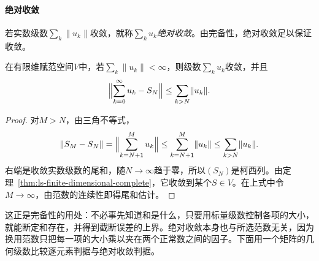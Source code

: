 \paragraph{绝对收敛}
若实数级数$\sum_k\lVert u_k\rVert$收敛，就称$\sum_ku_k$\emph{绝对收敛}。由完备性，绝对收敛足以保证收敛。
\begin{theorem}[绝对收敛的级数收敛]
\label{thm:ls-absolute-series-convergence}
在有限维赋范空间$V$中，若$\sum_k\lVert u_k\rVert<\infty$，则级数$\sum_ku_k$收敛，并且
\begin{equation}
 \Bigl\lVert\sum_{k=0}^\infty u_k-S_N\Bigr\rVert\leq\sum_{k>N}\lVert u_k\rVert .
 \label{eq:ls-absolute-series-tail}
\end{equation}
\end{theorem}
\begin{proof}
对$M>N$，由三角不等式，
\[
 \lVert S_M-S_N\rVert=\Bigl\lVert\sum_{k=N+1}^Mu_k\Bigr\rVert\leq\sum_{k=N+1}^M\lVert u_k\rVert\leq\sum_{k>N}\lVert u_k\rVert .
\]
右端是收敛实数级数的尾和，随$N\to\infty$趋于零，所以$(S_N)$是柯西列。由定理~\ref{thm:ls-finite-dimensional-complete}，它收敛到某个$S\in V$。在上式中令$M\to\infty$，由范数的连续性即得尾和估计。
\end{proof}
这正是完备性的用处：不必事先知道和是什么，只要用标量级数控制各项的大小，就能断定和存在，并得到截断误差的上界。绝对收敛本身也与所选范数无关，因为换用范数只把每一项的大小乘以夹在两个正常数之间的因子。下面用一个矩阵的几何级数比较逐元素判据与绝对收敛判据。
